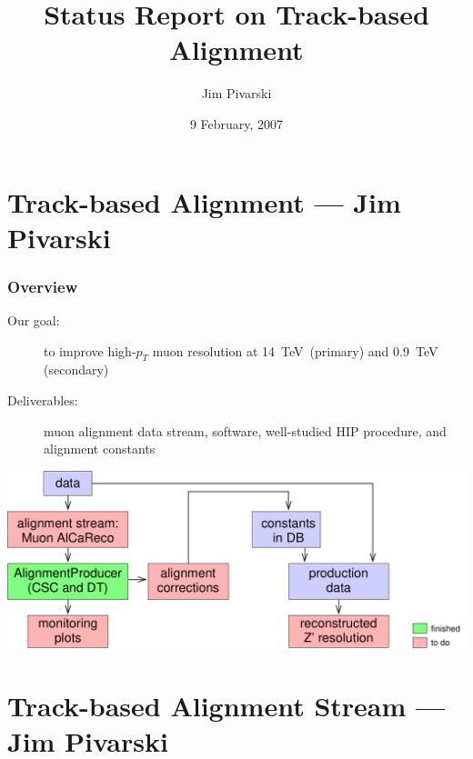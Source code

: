 \documentclass[compress]{beamer}
\title{Status Report on Track-based Alignment}
\author{Jim Pivarski}
\institute{Texas A\&M University}
\date{ 9 February, 2007}
\begin{document}
\frame{\titlepage}
\section*{Track-based Alignment --- Jim Pivarski}

\begin{frame}
  \frametitle{Overview}
  \begin{description}
    \item[Our goal:] to improve high-$p_T$ muon resolution at \mbox{14~TeV (primary)}
      and 0.9~TeV (secondary)
    \item[Deliverables:] muon alignment data stream, software,
    well-studied HIP procedure, and alignment constants
  \end{description}
  \begin{center}
    \includegraphics[width=\linewidth]{deliverables}
  \end{center}
\end{frame}

\section*{Track-based Alignment Stream --- Jim Pivarski}
\end{document}
